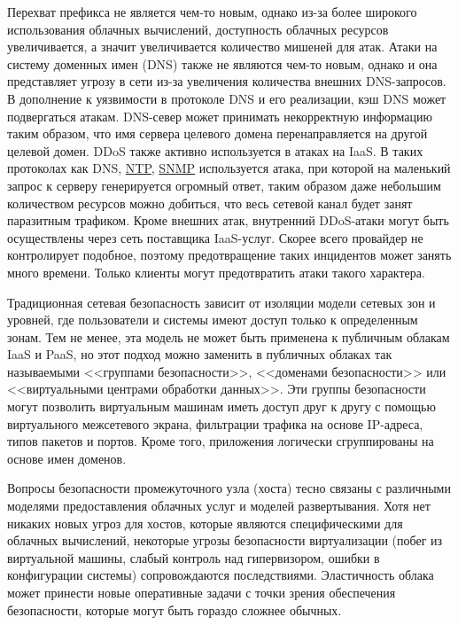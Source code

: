 Перехват префикса не является чем-то новым, однако из-за более широкого использования облачных вычислений, доступность облачных ресурсов увеличивается, а значит увеличивается количество мишеней для атак.
Атаки на систему доменных имен (DNS) также не являются чем-то новым, однако и она представляет угрозу в сети из-за увеличения количества внешних DNS-запросов.
В дополнение к уязвимости в протоколе DNS и его реализации, кэш DNS может подвергаться атакам.
DNS-север может принимать некорректную информацию таким образом, что имя сервера целевого домена перенаправляется на другой целевой домен.
DDoS также активно используется в атаках на IaaS.
В таких протоколах как DNS, \hyperlink{ntp}{NTP}, \hyperlink{snmp}{SNMP} используется атака, при которой на маленький запрос к серверу генерируется огромный ответ, таким образом даже небольшим количеством ресурсов можно добиться, что весь сетевой канал будет занят паразитным трафиком.
Кроме внешних атак, внутренний DDoS-атаки могут быть осуществлены через сеть поставщика IaaS-услуг.
Скорее всего провайдер не контролирует подобное, поэтому предотвращение таких инцидентов может занять много времени.
Только клиенты могут предотвратить атаки такого характера.

Традиционная сетевая безопасность зависит от изоляции модели сетевых зон и уровней, где пользователи и системы имеют доступ только к определенным зонам.
Тем не менее, эта модель не может быть применена к публичным облакам IaaS и PaaS, но этот подход можно заменить в публичных облаках так называемыми <<группами безопасности>>, <<доменами безопасности>> или <<виртуальными центрами обработки данных>>.
Эти группы безопасности могут позволить виртуальным машинам иметь доступ друг к другу с помощью виртуального межсетевого экрана, фильтрации трафика на основе IP-адреса, типов пакетов и портов.
Кроме того, приложения логически сгруппированы на основе имен доменов.

Вопросы безопасности промежуточного узла (хоста) тесно связаны с различными моделями предоставления облачных услуг и моделей развертывания.
Хотя нет никаких новых угроз для хостов, которые являются специфическими для облачных вычислений, некоторые угрозы безопасности виртуализации (побег из виртуальной машины, слабый контроль над гипервизором, ошибки в конфигурации системы) сопровождаются последствиями.
Эластичность облака может принести новые оперативные задачи с точки зрения обеспечения безопасности, которые могут быть гораздо сложнее обычных.

